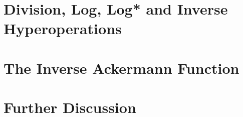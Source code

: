 \documentclass[a4paper,USenglish,cleveref, autoref]{lipics-v2019}
\theoremstyle{plain}
\theoremstyle{definition}
\begin{document}
\section{Division, Log, Log* and Inverse Hyperoperations}
\label{sec: inv-hyperop}


\section{The Inverse Ackermann Function}
\label{sec: inv-ack}


\section{Further Discussion}
\label{sec: discussion}
%




%




\end{document}
